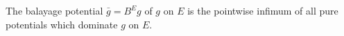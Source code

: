 The balayage potential $\bar{g} = B^E g$ of $g$ on $E$ is the pointwise infimum of all pure potentials which dominate $g$ on $E$.
